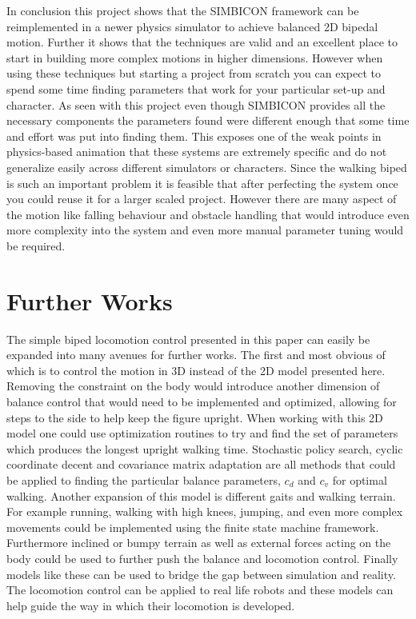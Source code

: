 \documentclass[12pt, a4paper]{article}
\begin{document}
In conclusion this project shows that the SIMBICON framework can be reimplemented in a newer physics simulator to achieve balanced 2D bipedal motion. Further it shows that the techniques are valid and an excellent place to start in building more complex motions in higher dimensions. However when using these techniques but starting a project from scratch you can expect to spend some time finding parameters that work for your particular set-up and character. As seen with this project even though SIMBICON provides all the necessary components the parameters found were different enough that some time and effort was put into finding them. This exposes one of the weak points in physics-based animation that these systems are extremely specific and do not generalize easily across different simulators or characters. Since the walking biped is such an important problem it is feasible that after perfecting the system once you could reuse it for a larger scaled project. However there are many aspect of the motion like falling behaviour and obstacle handling that would introduce even more complexity into the system and even more manual parameter tuning would be required. 

\newpage
\section{Further Works}
The simple biped locomotion control presented in this paper can easily be expanded into many avenues for further works. The first and most obvious of which is to control the motion in 3D instead of the 2D model presented here. Removing the constraint on the body would introduce another dimension of balance control that would need to be implemented and optimized, allowing for steps to the side to help keep the figure upright. When working with this 2D model one could use optimization routines to try and find the set of parameters which produces the longest upright walking time. Stochastic policy search, cyclic coordinate decent and covariance matrix adaptation are all methods that could be applied to finding the particular balance parameters, $c_d$ and $c_v$ for optimal walking. Another expansion of this model is different gaits and walking terrain. For example running, walking with high knees, jumping, and even more complex movements could be implemented using the finite state machine framework. Furthermore inclined or bumpy terrain as well as external forces acting on the body could be used to further push the balance and locomotion control. Finally models like these can be used to bridge the gap between simulation and reality. The locomotion control can be applied to real life robots and these models can help guide the way in which their locomotion is developed. 
\end{document}
